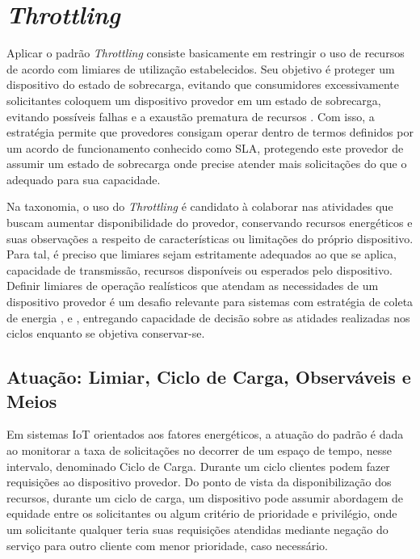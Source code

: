 \section{\textit{Throttling}}

Aplicar o padrão \textit{Throttling} consiste basicamente em restringir o uso de recursos de acordo com limiares de utilização estabelecidos. Seu objetivo é proteger um dispositivo do estado de sobrecarga, evitando que consumidores excessivamente solicitantes coloquem um dispositivo provedor em um estado de sobrecarga, evitando possíveis falhas e a exaustão prematura de recursos \cite{martinekuan_throttling_nodate}. Com isso, a estratégia permite que provedores consigam operar dentro de termos definidos por um acordo de funcionamento conhecido como \acf{SLA}, protegendo este provedor de assumir um estado de sobrecarga onde precise atender mais solicitações do que o adequado para sua capacidade.

Na taxonomia, o uso do \textit{Throttling} é candidato à colaborar nas atividades que buscam aumentar disponibilidade do provedor, conservando  recursos energéticos e suas observações a respeito de características ou limitações do próprio dispositivo. Para tal, é preciso que limiares sejam estritamente adequados ao que se aplica, capacidade de transmissão, recursos disponíveis ou esperados pelo dispositivo. Definir limiares de operação realísticos que atendam as necessidades de um dispositivo provedor é um desafio relevante para sistemas com estratégia de coleta de energia \cite{khairnar_discrete-rate_2015}, \cite{liu_energy_2016} e \cite{zhang_toward_2018}, entregando capacidade de decisão sobre as atidades realizadas nos ciclos enquanto se objetiva conservar-se.

\subsection{Atuação: Limiar, Ciclo de Carga, Observáveis e Meios}
\label{cap4:atuação}
Em sistemas \acs{IoT} orientados aos fatores energéticos, a atuação do padrão é dada ao monitorar a taxa de solicitações no decorrer de um espaço de tempo, nesse intervalo, denominado Ciclo de Carga. Durante um ciclo clientes podem fazer requisições ao dispositivo provedor. Do ponto de vista da disponibilização dos recursos, durante um ciclo de carga, um dispositivo pode assumir abordagem de equidade entre os solicitantes ou algum critério de prioridade e privilégio, onde um solicitante qualquer teria suas requisições atendidas mediante negação do serviço para outro cliente com menor prioridade, caso necessário.

